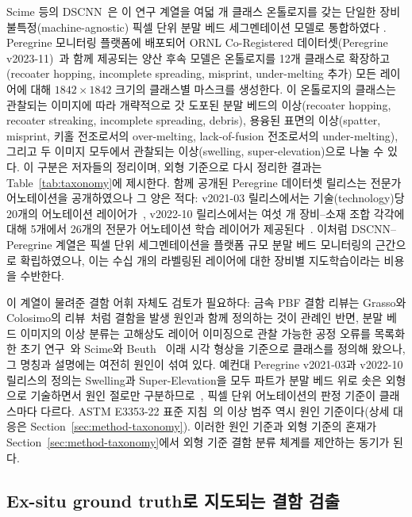 Scime 등의 DSCNN~\cite{Scime2020DSCNN}은 이 연구 계열을 여덟 개 클래스
온톨로지를 갖는 단일한 장비 불특정(machine-agnostic) 픽셀 단위 분말 베드
세그멘테이션 모델로 통합하였다 .
Peregrine 모니터링 플랫폼에 배포되어 ORNL Co-Registered 데이터셋(Peregrine
v2023-11)~\cite{ORNL_CoRegistered_Dataset}과 함께 제공되는 양산 후속 모델은
온톨로지를 12개 클래스로 확장하고(recoater hopping, incomplete spreading,
misprint, under-melting 추가) 모든 레이어에 대해 $1842\times1842$ 크기의
클래스별 마스크를 생성한다. 이 온톨로지의 클래스는 관찰되는 이미지에
따라 개략적으로 갓 도포된 분말 베드의 이상(recoater hopping, recoater
streaking, incomplete spreading, debris), 용융된 표면의 이상(spatter,
misprint, 키홀 전조로서의 over-melting, lack-of-fusion 전조로서의
under-melting), 그리고 두 이미지 모두에서 관찰되는 이상(swelling,
super-elevation)으로 나눌 수 있다. 이 구분은 저자들의 정리이며, 외형
기준으로 다시 정리한 결과는 Table~\ref{tab:taxonomy}에 제시한다. 함께
공개된 Peregrine 데이터셋 릴리스는 전문가 어노테이션을 공개하였으나 그
양은 적다: v2021-03 릴리스에서는
기술(technology)당 20개의 어노테이션 레이어가~\cite{Peregrine_v2021_03},
v2022-10 릴리스에서는 여섯 개 장비--소재 조합 각각에 대해 5개에서 26개의
전문가 어노테이션 학습 레이어가 제공된다~\cite{Peregrine_v2022_10}. 이처럼
DSCNN--Peregrine 계열은 픽셀 단위 세그멘테이션을 플랫폼 규모 분말 베드
모니터링의 근간으로 확립하였으나, 이는 수십 개의 라벨링된 레이어에 대한
장비별 지도학습이라는 비용을 수반한다.

이 계열이 물려준 결함 어휘 자체도 검토가 필요하다: 금속 PBF 결함 리뷰는
Grasso와 Colosimo의 리뷰~\cite{Grasso2017Review}처럼 결함을 발생 원인과
함께 정의하는 것이 관례인 반면, 분말 베드 이미지의 이상 분류는 고해상도
레이어 이미징으로 관찰 가능한 공정 오류를 목록화한 초기
연구~\cite{zurJacobsmuhlen2013HighRes}와 Scime와
Beuth~\cite{Scime2018Anomaly} 이래 시각 형상을 기준으로 클래스를 정의해
왔으나, 그 명칭과 설명에는 여전히 원인이 섞여 있다. 예컨대 Peregrine
v2021-03과 v2022-10 릴리스의 정의는 Swelling과 Super-Elevation을 모두
파트가 분말 베드 위로 솟은 외형으로 기술하면서 원인 절로만
구분하므로~\cite{Peregrine_v2021_03,Peregrine_v2022_10}, 픽셀 단위
어노테이션의 판정 기준이 클래스마다 다르다. ASTM E3353-22 표준
지침~\cite{ASTME3353}의 이상 범주 역시 원인 기준이다(상세 대응은
Section~\ref{sec:method-taxonomy}). 이러한 원인 기준과 외형 기준의 혼재가
Section~\ref{sec:method-taxonomy}에서 외형 기준 결함 분류 체계를 제안하는
동기가 된다.

\subsection{Ex-situ ground truth로 지도되는 결함 검출}
\label{sec:related-exsitu}

